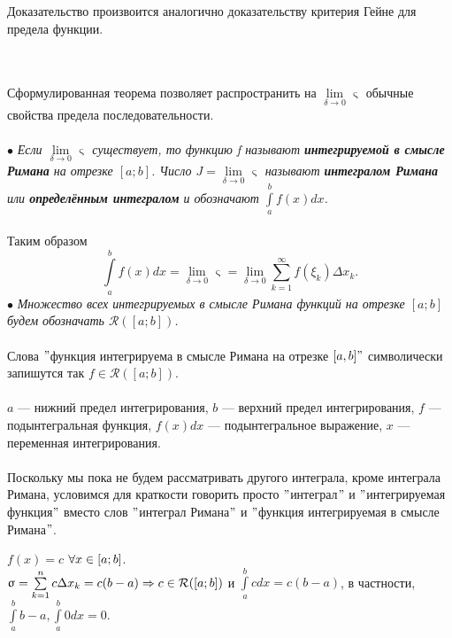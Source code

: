 \begin{Proof}
	Доказательство произвоится аналогично доказательству критерия Гейне для предела функции.
\end{Proof}\\\\
Сформулированная теорема позволяет распространить на $ \lim\limits_{\delta \rightarrow{} 0} \upvarsigma $ обычные свойства предела последовательности. \\\\
$\bullet$ \textit{Если $ \lim\limits_{\delta \rightarrow{} 0} \upvarsigma $ существует, то функцию f  называют \textbf{интегрируемой в смысле Римана} на отрезке $[a; b]$. Число $ J = \lim\limits_{\delta \rightarrow{} 0} \upvarsigma $ называют \textbf{интегралом Римана} или \textbf{определённым интегралом} и обозначают $ \int\limits_a^b f(x)dx $.} \\\\
Таким образом $$ \int\limits_a^b f(x)dx = \lim\limits_{\delta \rightarrow{} 0} \upvarsigma = \lim\limits_{\delta \rightarrow{} 0} \sum\limits_{k = 1}^{\infty} f(\xi_k) \Delta x_k .$$
$\bullet$ \textit{Множество всех интегрируемых в смысле Римана функций на отрезке $[a; b]$ будем обозначать $\mathcal{R}([a; b])$.}\\\\
Слова $"$функция интегрируема в смысле Римана на отрезке $[a,b]"$ символически запишутся так $f\in\mathcal{R}([a; b])$.\\\\
$a$ --- нижний предел интегрирования, $b$ --- верхний предел интегрирования, $f$ --- подынтегральная функция, $f(x)dx$ --- подынтегральное выражение, $x$ --- переменная интегрирования.\\\\
Поскольку мы пока не будем рассматривать другого интеграла, кроме интеграла Римана, условимся для краткости говорить просто $"$интеграл$"$ и $"$интегрируемая функция$"$ вместо слов $"$интеграл Римана$"$ и $"$функция интегрируемая в смысле Римана$"$.\\
\begin{example}
	$f(x) = c$ $\forall x \in [a;b]$.\\
	$\upvarsigma= \sum\limits^n_{k=1}c\Delta x_k = c(b-a)\Rightarrow c \in\mathcal{R}([a; b])$ и $\int\limits_a^b cdx = c(b-a)$, в частности, $\int\limits^b_ab-a, \int\limits^b_a0dx = 0$.
\end{example}
